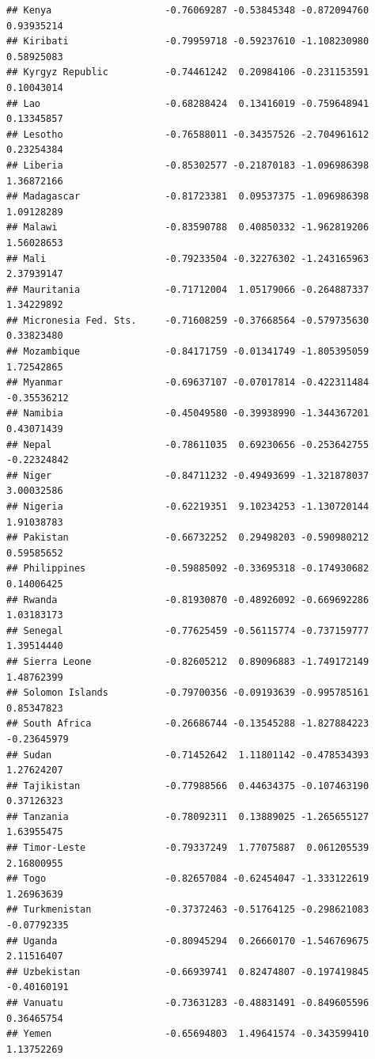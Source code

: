 \documentclass[
]{article}
\begin{document}
\begin{verbatim}
## Kenya                    -0.76069287 -0.53845348 -0.872094760  0.93935214
## Kiribati                 -0.79959718 -0.59237610 -1.108230980  0.58925083
## Kyrgyz Republic          -0.74461242  0.20984106 -0.231153591  0.10043014
## Lao                      -0.68288424  0.13416019 -0.759648941  0.13345857
## Lesotho                  -0.76588011 -0.34357526 -2.704961612  0.23254384
## Liberia                  -0.85302577 -0.21870183 -1.096986398  1.36872166
## Madagascar               -0.81723381  0.09537375 -1.096986398  1.09128289
## Malawi                   -0.83590788  0.40850332 -1.962819206  1.56028653
## Mali                     -0.79233504 -0.32276302 -1.243165963  2.37939147
## Mauritania               -0.71712004  1.05179066 -0.264887337  1.34229892
## Micronesia Fed. Sts.     -0.71608259 -0.37668564 -0.579735630  0.33823480
## Mozambique               -0.84171759 -0.01341749 -1.805395059  1.72542865
## Myanmar                  -0.69637107 -0.07017814 -0.422311484 -0.35536212
## Namibia                  -0.45049580 -0.39938990 -1.344367201  0.43071439
## Nepal                    -0.78611035  0.69230656 -0.253642755 -0.22324842
## Niger                    -0.84711232 -0.49493699 -1.321878037  3.00032586
## Nigeria                  -0.62219351  9.10234253 -1.130720144  1.91038783
## Pakistan                 -0.66732252  0.29498203 -0.590980212  0.59585652
## Philippines              -0.59885092 -0.33695318 -0.174930682  0.14006425
## Rwanda                   -0.81930870 -0.48926092 -0.669692286  1.03183173
## Senegal                  -0.77625459 -0.56115774 -0.737159777  1.39514440
## Sierra Leone             -0.82605212  0.89096883 -1.749172149  1.48762399
## Solomon Islands          -0.79700356 -0.09193639 -0.995785161  0.85347823
## South Africa             -0.26686744 -0.13545288 -1.827884223 -0.23645979
## Sudan                    -0.71452642  1.11801142 -0.478534393  1.27624207
## Tajikistan               -0.77988566  0.44634375 -0.107463190  0.37126323
## Tanzania                 -0.78092311  0.13889025 -1.265655127  1.63955475
## Timor-Leste              -0.79337249  1.77075887  0.061205539  2.16800955
## Togo                     -0.82657084 -0.62454047 -1.333122619  1.26963639
## Turkmenistan             -0.37372463 -0.51764125 -0.298621083 -0.07792335
## Uganda                   -0.80945294  0.26660170 -1.546769675  2.11516407
## Uzbekistan               -0.66939741  0.82474807 -0.197419845 -0.40160191
## Vanuatu                  -0.73631283 -0.48831491 -0.849605596  0.36465754
## Yemen                    -0.65694803  1.49641574 -0.343599410  1.13752269

\end{verbatim}
\end{document}
